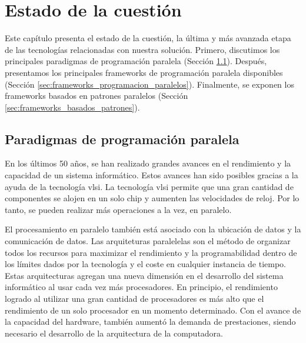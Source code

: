 \chead[]{}
\renewcommand{\headrulewidth}{0.5pt}

\lfoot[]{}
\cfoot[]{}
\rfoot[]{}
\renewcommand{\footrulewidth}{0pt}

\chapter{Estado de la cuestión}
\label{ch:estado_de_la_cuestion}

Este capítulo presenta el estado de la cuestión, la última y más avanzada etapa de las tecnologías relacionadas con nuestra solución. Primero, discutimos los principales paradigmas de programación paralela (Sección \ref{sec:paradigmas_programacion_paralela}). Después, presentamos los principales frameworks de programación paralela disponibles (Sección \ref{sec:frameworks_programacion_paralelos}). Finalmente, se exponen los frameworks basados en patrones paralelos (Sección \ref{sec:frameworks_basados_patrones}). 

\section{Paradigmas de programación paralela}
\label{sec:paradigmas_programacion_paralela}

En los últimos 50 años, se han realizado grandes avances en el rendimiento y la capacidad de un sistema informático. Estos avances han sido posibles gracias a la ayuda de la tecnología \acrshort{vlsi}. La tecnología \acrshort{vlsi} permite que una gran cantidad de componentes se alojen en un solo chip y aumenten las velocidades de reloj. Por lo tanto, se pueden realizar más operaciones a la vez, en paralelo.

El procesamiento en paralelo también está asociado con la ubicación de datos y la comunicación de datos. Las arquiteturas paralelelas son el método de organizar todos los recursos para maximizar el rendimiento y la programabilidad dentro de los límites dados por la tecnología y el coste en cualquier instancia de tiempo. Estas arquitecturas agregan una nueva dimensión en el desarrollo del sistema informático al usar cada vez más procesadores. En principio, el rendimiento logrado al utilizar una gran cantidad de procesadores es más alto que el rendimiento de un solo procesador en un momento determinado. Con el avance de la capacidad del hardware, también aumentó la demanda de prestaciones, siendo necesario el desarrollo de la arquitectura de la computadora. 

